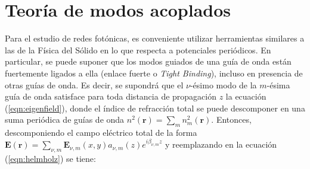 \section{Teoría de modos acoplados}
	Para el estudio de redes fotónicas, es conveniente utilizar herramientas similares a las de la Física del Sólido en lo que respecta a potenciales periódicos. En particular, se puede suponer que los modos guiados de una guía de onda están fuertemente ligados a ella (enlace fuerte o \textit{Tight Binding}), incluso en presencia de otras guías de onda. Es decir, se supondrá que el $\nu$-ésimo modo de la $m$-ésima guía de onda satisface para toda distancia de propagación $z$ la ecuación (\ref{eqn:eigenfield}), donde el índice de refracción total se puede descomponer en una suma periódica de guías de onda $n^2(\textbf{r}) = \sum_{m} n^2_m(\textbf{r})$. Entonces, descomponiendo el campo eléctrico total de la forma $\textbf{E}(\textbf{r}) = \sum_{\nu, m} \textbf{E}_{\nu, m}(x, y) a_{\nu, m}(z) e^{i\beta_{\nu, m} z}$ y reemplazando en la ecuación (\ref{eqn:helmholz}) se tiene:

